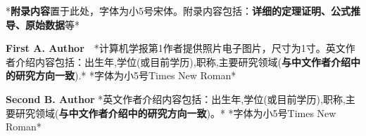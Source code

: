 

{\setlength\parindent{2em}
*\textbf{附录内容}置于此处，字体为小5号宋体。附录内容包括：\textbf{详细的定理证明、公式推导、原始数据}等*}


\begin{biography}
\noindent
\textbf{First A. Author}\ \ *计算机学报第1作者提供照片电子图片，尺寸为1寸。英文作者介绍内容包括：出生年,学位(或目前学历),职称,主要研究领域(\textbf{与中文作者介绍中的研究方向一致}).*
*字体为小5号Times New Roman*

\end{biography}

\begin{biography}
\noindent
\textbf{Second B. Author} *英文作者介绍内容包括：出生年,学位(或目前学历),职称,主要研究领域(\textbf{与中文作者介绍中的研究方向一致})。*
*字体为小5号Times New Roman*
\end{biography}

